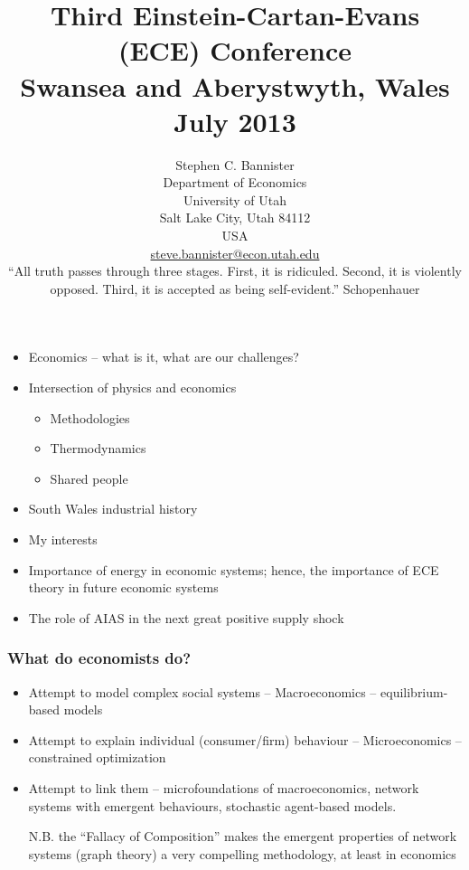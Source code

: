 \documentclass[final]{beamer}
\title{Third Einstein-Cartan-Evans (ECE) Conference\\Swansea and Aberystwyth, Wales\\July 2013} %
\author{Stephen C. Bannister\\
	Department of Economics\\
	University of Utah\\
	Salt Lake City, Utah 84112\\
	USA\\
	\href{mailto:steve.bannister@econ.utah.edu}{steve.bannister@econ.utah.edu}\\
	``All truth passes through three stages. First, it is ridiculed. Second, it is violently opposed. Third, it is accepted as being self-evident.'' Schopenhauer
	}
\date{}
\begin{document}

	\maketitle
	\nocite{*}
%	

	
%	

\begin{frame}
\begin{itemize}
\frametitle{Agenda}
\item Economics -- what is it, what are our challenges?
\item Intersection of physics and economics
	\begin{itemize}
	\item Methodologies
	\item Thermodynamics
	\item Shared people
	\end{itemize}
\item South Wales industrial history
\item My interests

\item Importance of energy in economic systems; hence, the importance of ECE theory in future economic systems
\item The role of AIAS in the next great positive supply shock
\end{itemize}
\end{frame}

\begin{frame}
\frametitle{What do economists do?}
\begin{itemize}	
\item Attempt to model complex social systems -- Macroeconomics -- equilibrium-based models
\item Attempt to explain individual (consumer/firm) behaviour -- Microeconomics -- constrained optimization
\item Attempt to link them -- microfoundations of macroeconomics, network systems with emergent behaviours, stochastic agent-based models. 
\par 
N.B. the ``Fallacy of Composition'' makes the emergent properties of network systems (graph theory) a very compelling methodology, at least in economics

\end{itemize}
\end{frame}
\end{document}
